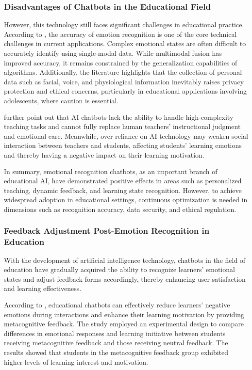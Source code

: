\documentclass{xum_review}
\begin{document}
\subsubsection{Disadvantages of Chatbots in the Educational Field}

However, this technology still faces significant challenges in educational
practice. According to \citet{arsad2024integrating}, the accuracy of emotion recognition
is one of the core technical challenges in current applications. Complex
emotional states are often difficult to accurately identify using single-modal
data. While multimodal fusion has improved accuracy, it remains constrained by
the generalization capabilities of algorithms. Additionally, the literature
highlights that the collection of personal data such as facial, voice, and
physiological information inevitably raises privacy protection and ethical
concerns, particularly in educational applications involving adolescents, where
caution is essential. 

\citet{siregar2024ai} further point out that AI chatbots lack the ability to
handle high-complexity teaching tasks and cannot fully replace human teachers'
instructional judgment and emotional care. Meanwhile, over-reliance on AI
technology may weaken social interaction between teachers and students,
affecting students' learning emotions and thereby having a negative impact on
their learning motivation. 

In summary, emotional recognition chatbots, as an important branch of
educational AI, have demonstrated positive effects in areas such as personalized
teaching, dynamic feedback, and learning state recognition. However, to achieve
widespread adoption in educational settings, continuous optimization is needed
in dimensions such as recognition accuracy, data security, and ethical
regulation. 

\subsubsection{Feedback Adjustment Post-Emotion Recognition in Education}
With the development of artificial intelligence technology, chatbots in the
field of education have gradually acquired the ability to recognize learners'
emotional states and adjust feedback forms accordingly, thereby enhancing user
satisfaction and learning effectiveness. 

According to \citet{yin2024effects}, educational chatbots
can effectively reduce learners' negative emotions during interactions and
enhance their learning motivation by providing metacognitive feedback. The study
employed an experimental design to compare differences in emotional responses
and learning initiative between students receiving metacognitive feedback and
those receiving neutral feedback. The results showed that students in the
metacognitive feedback group exhibited higher levels of learning interest and
motivation. 
\end{document}
